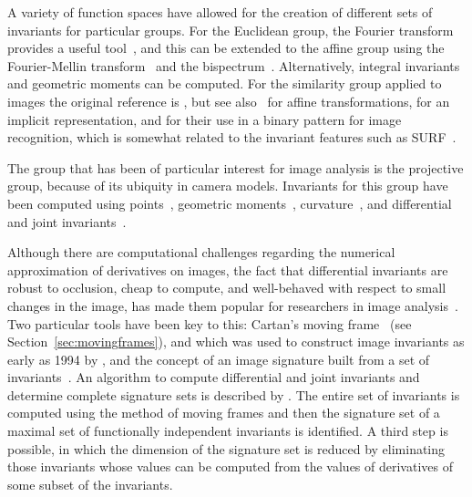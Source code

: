 \documentclass[review,onefignum,onetabnum]{siamonline190516}
\begin{document}
A variety of function spaces have allowed for the creation of different sets of invariants for particular groups. For the Euclidean group, the Fourier transform provides a useful tool~\citep{Ghorbel1994,Turski2006,Smach2007,Gauthier2008}, and this can be extended to the affine group using the Fourier-Mellin transform~\citep{Reddy1996,Zhang2019} and the bispectrum~\citep{Kakarala2009,Negrinho2013}. Alternatively, integral invariants~\citep{Manay2006,Feng2010} and geometric moments can be computed. For the similarity group applied to images the original reference is \citet{Hu1962}, but see also~\citet{Hickman2011} for affine transformations, \citet{Flusser2009} for an implicit representation, and \citet{Papakostas2013} for their use in a binary pattern for image recognition, which is somewhat related to the invariant features such as SURF~\citep{SURF}.

The group that has been of particular interest for image analysis is the projective group, because of its ubiquity in camera models. Invariants for this group have been computed using points~\citep{Gros1992,Suk2000}, geometric moments~\citep{Suk2004}, curvature~\citep{Hann2002a}, and differential and joint invariants~\citep{Hubert2007,Arora2009,Kogan2014,Li19}.

Although there are computational challenges regarding the numerical approximation of derivatives on images, the fact that differential invariants are robust to occlusion, cheap to compute, and well-behaved with respect to small changes in the image, has made them popular for researchers in image analysis~\citep{Florack1993}. Two particular tools have been key to this: Cartan's moving frame~\citep{Cartan35} (see Section~\ref{sec:movingframes}), and which was used to construct image invariants as early as 1994 by \citet{Faugeras1994}, and the concept of an image signature built from a set of invariants~\citep{Calabi1998}. An algorithm to compute differential and joint invariants and determine complete signature sets is described by \citet{Olver2005,Olver2007}. The entire set of invariants is computed using the method of moving frames and then the signature set of a maximal set of functionally independent invariants is identified. A third step is possible, in which the dimension of the signature set is reduced by eliminating those invariants whose values can be computed from the values of derivatives of some subset of the invariants. 

\end{document}
